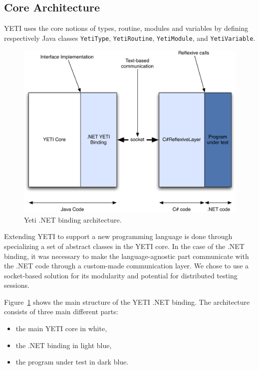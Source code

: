 \subsection{Core Architecture}
YETI uses the core notions of types, routine, modules and variables by defining respectively Java classes 
\texttt{YetiType}, \texttt{YetiRoutine}, \texttt{YetiModule}, and \texttt{YetiVariable}.

\begin{figure}[h]
\begin{center}
\includegraphics[width=\columnwidth]{images/Architecture.pdf}
\end{center}
\caption{Yeti .NET binding architecture.}\label{fig:archi}
\end{figure}

Extending YETI to support a new programming language is done through specializing a set of abstract classes in the YETI core.
In the case of the .NET binding, it was necessary to make the language-agnostic part communicate with the .NET code through a custom-made communication layer. We chose to use a socket-based solution for its modularity and potential for distributed testing sessions.

Figure~\ref{fig:archi} shows the main structure of the YETI .NET binding. The architecture consists of three main different parts: 
\begin{itemize}
\item the main YETI core in white,
\item the .NET binding in light blue,
\item the program under test in dark blue.
\end{itemize} 

